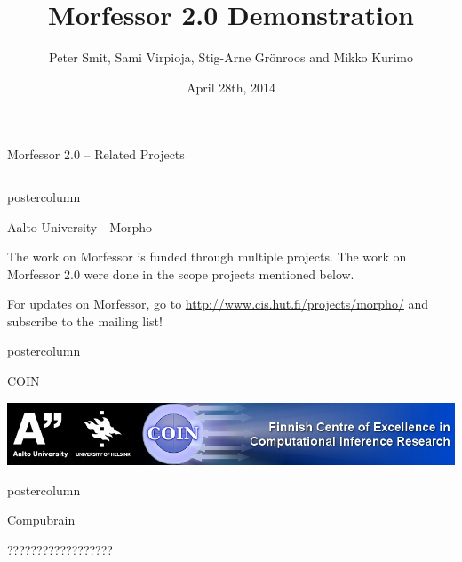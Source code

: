 \documentclass[final]{beamer} %
\title{Morfessor 2.0 Demonstration}
\author{Peter Smit, Sami Virpioja, Stig-Arne Gr\"onroos and Mikko Kurimo}
\institute[Aalto University]{Aalto University}
\date{April 28th, 2014}
\begin{document}
  \begin{frame}{Morfessor 2.0 -- Related Projects} 
\begin{columns}



\begin{column}{.49\textwidth}
  \begin{beamercolorbox}[center,wd=\textwidth]{postercolumn}
 \begin{block}{Aalto University  - Morpho}

The work on Morfessor is funded through multiple projects. The work on Morfessor 2.0 were done in the scope projects mentioned below.

For updates on Morfessor, go to  \url{http://www.cis.hut.fi/projects/morpho/}  and subscribe to the mailing list!

%


            \end{block}
            
	\end{beamercolorbox}
\vfill

  \begin{beamercolorbox}[center,wd=\textwidth]{postercolumn}
 \begin{block}{COIN}
\vspace{1cm}

              \includegraphics[width=\textwidth]{coinbanner}            
            \end{block}
            
	\end{beamercolorbox}
\vfill


  \begin{beamercolorbox}[center,wd=\textwidth]{postercolumn}
 \begin{block}{Compubrain}
\vspace{1cm}

??????????????????
            \end{block}
            

\end{beamercolorbox}
\end{column}
\end{columns}
\end{frame}
\end{document}
